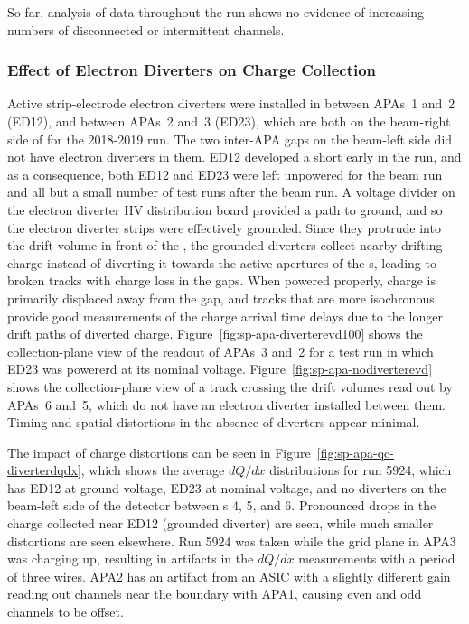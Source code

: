 So far, analysis of data throughout the  run shows no evidence of increasing numbers of disconnected or intermittent channels.



\subsubsection{Effect of Electron Diverters on Charge Collection}
\label{sec:fdsp-apa-qa-protodune-ops-electron-diverters-charge}

Active strip-electrode electron diverters were installed in  between APAs~1 and~2 (ED12),
and between APAs~2 and~3 (ED23), which are both on the beam-right side of  for 
the 2018-2019 run.  The two inter-APA gaps on the beam-left side did not have electron diverters in them. ED12 developed a short early in the run, and as a consequence, both ED12 and ED23 were left unpowered for the beam run and all but a small number of test runs after the beam run.  A voltage divider on the electron diverter HV distribution board provided a path to ground, and so the electron diverter strips were effectively grounded.  Since they protrude into the drift volume in front of the , the grounded diverters collect nearby drifting charge instead of diverting it towards the active apertures of the s, %
leading to broken tracks with charge loss in the gaps.  When powered properly, charge is primarily displaced away from the gap, and tracks that are more isochronous provide good measurements of the charge arrival time delays due to the longer drift paths of diverted charge. Figure~\ref{fig:sp-apa-diverterevd100} shows the collection-plane view of the readout of APAs~3 and~2 for a test run in which ED23 was powererd at its nominal voltage. Figure~\ref{fig:sp-apa-nodiverterevd} shows the collection-plane view of a track crossing the drift volumes read out by APAs~6 and~5, which do not have an electron diverter installed between them.  Timing and spatial distortions in the absence of diverters appear minimal.

The impact of charge distortions can be seen in Figure~\ref{fig:sp-apa-qc-diverterdqdx}, which shows the average $dQ/dx$ distributions for  run 5924, which has ED12 at ground voltage, ED23 at nominal voltage, and no diverters on the beam-left side of the detector between s 4, 5, and 6.  Pronounced drops in the charge collected near ED12 (grounded diverter) are seen, while much smaller distortions are seen elsewhere.  Run 5924 was taken while the grid plane in APA3 was charging up, resulting in artifacts in the $dQ/dx$ measurements with a period of three wires.  APA2 has an artifact from an ASIC with a slightly different gain reading out channels near the boundary with APA1, causing even and odd channels to be offset.

